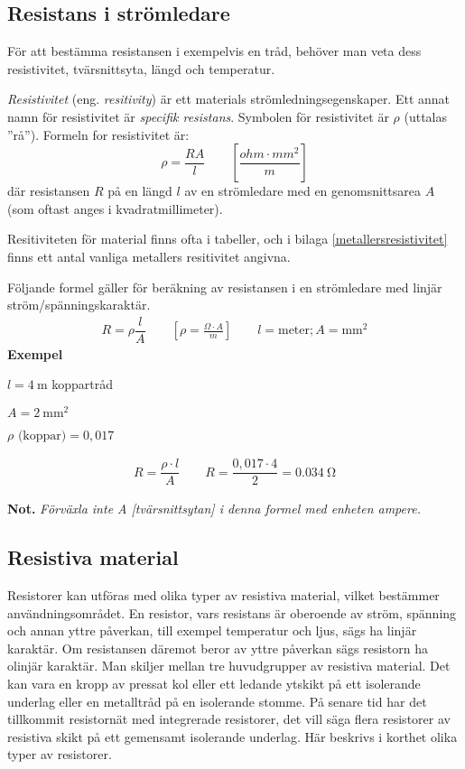 \subsection{Resistans i strömledare}

För att bestämma resistansen i exempelvis en tråd, behöver man veta dess 
resistivitet, tvärsnittsyta, längd och temperatur.

\emph{Resistivitet} (eng. \emph{resitivity}) är ett materials
strömledningsegenskaper.
Ett annat namn för resistivitet är \emph{specifik resistans}.
Symbolen för resistivitet är \(\rho\) (uttalas ''rå'').
Formeln for resistivitet är:
\[\rho = \dfrac{R A}{l}\qquad \left[\dfrac{ohm \cdot mm^2}{m}\right]\]
där resistansen \(R\) på en längd \(l\) av en strömledare med en
genomsnittsarea \(A\) (som oftast anges i kvadratmillimeter).

Resitiviteten för material finns ofta i tabeller, och i bilaga
\ref{metallersresistivitet} finns ett antal vanliga metallers resitivitet
angivna.

Följande formel gäller för beräkning av resistansen i en strömledare med
linjär ström/spänningskaraktär.
\[\begin{array}{c}
    R = \rho \dfrac{l}{A} \qquad \left[\rho = \frac{\Omega \cdot A}{m} \right] \qquad l=\text{meter}; A=\si{\milli\metre\squared}
\end{array}\]
\noindent
\textbf{Exempel}

\(l = \SI{4}{\metre}\) koppartråd

\(A = \SI{2}{\milli\metre\squared}\)

\(\rho \text{ (koppar)} = 0,017\)

\[\begin{array}{c}
R = \dfrac{\rho \cdot l}{A} \qquad R = \dfrac{0,017 \cdot 4}{2} = \SI{0,034}{\ohm}
\end{array}\]

\noindent
\textbf{Not.} \emph{Förväxla inte A [tvärsnittsytan] i denna formel med enheten ampere.}

\subsection{Resistiva material}

Resistorer kan utföras med olika typer av resistiva material, vilket bestämmer
användningsområdet. En resistor, vars resistans är oberoende av ström, spänning
och annan yttre påverkan, till exempel temperatur och ljus, sägs ha linjär karaktär.
Om resistansen däremot beror av yttre påverkan sägs resistorn ha olinjär
karaktär. Man skiljer mellan tre huvudgrupper av resistiva material. Det kan
vara en kropp av pressat kol eller ett ledande ytskikt på ett isolerande
underlag eller en metalltråd på en isolerande stomme. På senare tid har det
tillkommit resistornät med integrerade resistorer, det vill säga flera resistorer av
resistiva skikt på ett gemensamt isolerande underlag. Här beskrivs i korthet
olika typer av resistorer.

